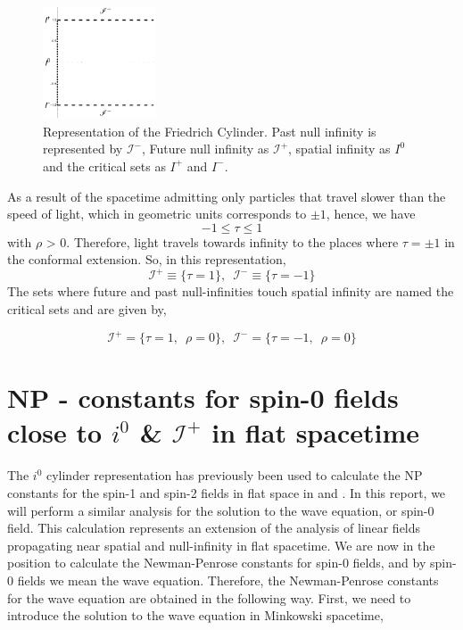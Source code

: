 \documentclass[
11pt, %
english, %
singlespacing, %
headsepline, %
]{MastersDoctoralThesis} %
\begin{document}
\begin{figure}
	\centering
    \includegraphics[width =0.3\textwidth]{friedrich cylinder.pdf}
    \caption{Representation of the Friedrich Cylinder. Past null infinity is represented by $\mathscr{I}^-$, Future null infinity as $\mathscr{I}^+$, spatial infinity as $I^{0}$ and the critical sets as $I^{+}$ and $I^{-}$.}
\end{figure}

As a result of the spacetime admitting only particles that travel
slower than the speed of light, which in geometric units corresponds to $\pm 1$,
hence, we have
$$ -1 \le \tau \le 1 $$ with $\rho$ > 0. Therefore, light travels towards infinity to
the places where $\tau = \pm 1$ in the conformal extension. So, in this representation,
$$ \mathscr{I}^+ \equiv \{ \tau = 1 \}, \enspace \mathscr{I}^- \equiv
\{ \tau = -1 \}$$ The sets where future and past null-infinities touch
spatial infinity are named the critical sets and are given by,

$$ \mathcal{I}^+ = \{ \tau = 1, \enspace \rho = 0\}, \enspace
\mathcal{I}^- = \{ \tau = -1, \enspace \rho = 0\}$$

\section{NP - constants for spin-0 fields close to $i^{0}$ \& $\mathscr{I}^+$ in flat spacetime}
The $i^0$ cylinder representation has previously been used to
calculate the NP constants for the spin-1 and spin-2 fields in flat
space in \cite{ValKro02gb} and \cite{GasKro16d}. In this report, we
will perform a similar analysis for the solution to the wave equation,
or spin-0 field. This calculation represents an extension of the
analysis of linear fields propagating near spatial and null-infinity
in flat spacetime.  We are now in the position to calculate the
Newman-Penrose constants for spin-0 fields, and by spin-0 fields
we mean the wave equation. Therefore, the Newman-Penrose constants for
the wave equation are obtained in the following way.
First, we need to introduce the solution to the wave equation in
Minkowski spacetime,
\end{document}

